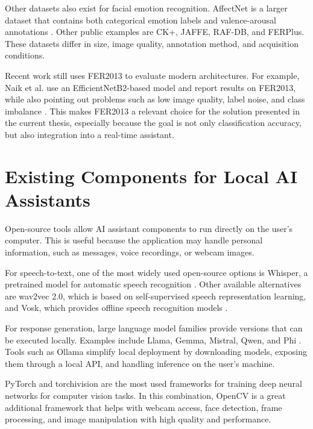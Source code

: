 Other datasets also exist for facial emotion recognition. AffectNet is a larger dataset that contains both categorical emotion labels and valence-arousal annotations \cite{mollahosseini2019affectnet}. Other public examples are CK+, JAFFE, RAF-DB, and FERPlus. These datasets differ in size, image quality, annotation method, and acquisition conditions.

Recent work still uses FER2013 to evaluate modern architectures. For example, Naik et al. use an EfficientNetB2-based model and report results on FER2013, while also pointing out problems such as low image quality, label noise, and class imbalance \cite{naik2026efficientnetb2}. This makes FER2013 a relevant choice for the solution presented in the current thesis, especially because the goal is not only classification accuracy, but also integration into a real-time assistant.

\section{Existing Components for Local AI Assistants}

Open-source tools allow AI assistant components to run directly on the user's computer. This is useful because the application may handle personal information, such as messages, voice recordings, or webcam images.

For speech-to-text, one of the most widely used open-source options is Whisper, a pretrained model for automatic speech recognition \cite{radford2022whisper}. Other available alternatives are wav2vec 2.0, which is based on self-supervised speech representation learning, and Vosk, which provides offline speech recognition models \cite{baevski2020wav2vec}.

For response generation, large language model families provide versions that can be executed locally. Examples include Llama, Gemma, Mistral, Qwen, and Phi \cite{touvron2023llama2,gemma2024,jiang2023mistral}. Tools such as Ollama simplify local deployment by downloading models, exposing them through a local API, and handling inference on the user's machine.

PyTorch and torchivision are the most used frameworks for training deep neural networks for computer vision tasks. In this combination, OpenCV is a great additional framework that helps with webcam access, face detection, frame processing, and image manipulation with high quality and performance.